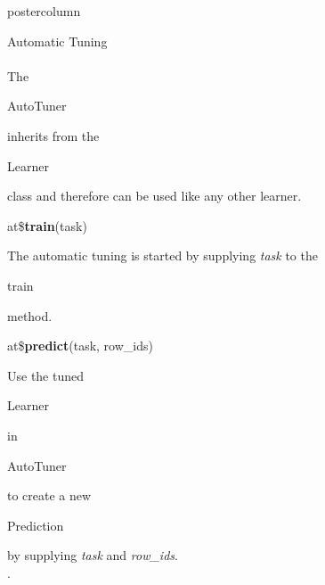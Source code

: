 \documentclass{beamer}
\newcommand{\codeinline}[1]{\begin{codeboxinline}#1\end{codeboxinline}}
\begin{document}
\begin{frame}[fragile]{}
\begin{columns}
\begin{column}{.245\textwidth}
\begin{beamercolorbox}[center]{postercolumn}
\begin{minipage}{.98\textwidth}
{\begin{myblock}{Automatic Tuning}
						\\
						\\
						The \codeinline{AutoTuner} inherits from the \codeinline{Learner} class and therefore can be used like any other learner.
						\\
						\begin{codebox}
							at\$\textbf{train}(task)
						\end{codebox}
						The automatic tuning is started by supplying \textit{task} to the \codeinline{train} method.
						\\
						\begin{codebox}
							at\$\textbf{predict}(task, row\_ids)
						\end{codebox}
						Use the tuned \codeinline{Learner} in \codeinline{AutoTuner} to create a new \codeinline{Prediction} by supplying \textit{task} and \textit{row\_ids}.
						\\
						.
						\end{myblock}
					\vfill}
				\end{minipage}
			\end{beamercolorbox}
		\end{column}
	\end{columns}
\end{frame}
\end{document}
